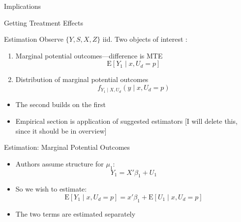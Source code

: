 \documentclass{beamer}
\begin{document}
\begin{frame}{Implications}
\end{frame}


\begin{frame}{Getting Treatment Effects}
\end{frame}

\begin{frame}{Estimation} 
Observe $\{Y,S,X,Z\}$ iid. Two objects of interest :
\begin{enumerate}
\item Marginal potential outcomes---difference is MTE
\begin{equation*}
  \mathrm{E}[Y_1\mid x,U_d=p]
\end{equation*}
\item Distribution of marginal potential outcomes
  \begin{equation*}
    f_{Y_1\mid X,U_d}(y\mid x,U_d=p)
  \end{equation*}
\end{enumerate}
\begin{itemize}
\item The second builds on the first
\item Empirical section is application of suggested estimators [I will
  delete this, since it should be in overview]
\end{itemize}
  
\end{frame}

\begin{frame}{Estimation: Marginal Potential Outcomes  }
  \begin{itemize}
  \item Authors assume structure for $\mu_1$:
    \begin{equation*}
      Y_1  = X'\beta_1 +  U_1
    \end{equation*}
\item So we wish to estimate:
    \begin{equation*}
      \mathrm{E}[Y_1\mid x,U_d=p]  = x'\beta_1 +  \mathrm{E}[U_1\mid x,U_d=p]
    \end{equation*} 
\item The two terms are estimated separately
  \end{itemize}
\end{frame}
\end{document}
